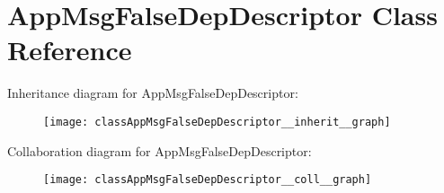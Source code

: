 \hypertarget{classAppMsgFalseDepDescriptor}{}\section{App\+Msg\+False\+Dep\+Descriptor Class Reference}
\label{classAppMsgFalseDepDescriptor}


Inheritance diagram for App\+Msg\+False\+Dep\+Descriptor\+:\nopagebreak
\begin{figure}[H]
\begin{center}
\leavevmode
\texttt{[image: classAppMsgFalseDepDescriptor\_\_inherit\_\_graph]}
\end{center}
\end{figure}


Collaboration diagram for App\+Msg\+False\+Dep\+Descriptor\+:\nopagebreak
\begin{figure}[H]
\begin{center}
\leavevmode
\texttt{[image: classAppMsgFalseDepDescriptor\_\_coll\_\_graph]}
\end{center}
\end{figure}
